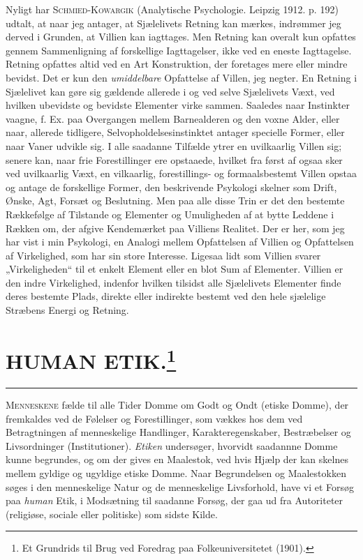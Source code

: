 \documentclass[12pt,a4paper,openany]{book}
\newcommand{\opage}[1]{\marginnote{\footnotesize\textit{[#1]}}}
\newcommand{\essay}[2][]{\chapter*{#2}\addcontentsline{toc}{chapter}{#1}}   %
\newcommand{\streg}{\begin{center}\rule{3em}{0.4pt}\end{center}}
\begin{document}
Nyligt har \textsc{Schmied-Kowargik} (Analytische Psychologie.
Leipzig 1912. p. 192) udtalt, at naar jeg antager, at Sjælelivets
Retning kan mærkes, indrømmer jeg derved i Grunden, at
Villien kan iagttages. Men Retning kan overalt kun opfattes
gennem Sammenligning af forskellige Iagttagelser, ikke ved en
eneste Iagttagelse. Retning opfattes altid ved en Art Konstruktion,
der foretages mere eller mindre bevidst. Det er kun den
\textit{umiddelbare} Opfattelse af Villen, jeg negter. En Retning i Sjælelivet
kan gøre sig gældende allerede i og ved selve Sjælelivets
Væxt, ved hvilken ubevidste og bevidste Elementer virke sammen.
Saaledes naar Instinkter vaagne, f. Ex. paa Overgangen
mellem Barnealderen og den voxne Alder, eller naar, allerede
tidligere, Selvopholdelsesinstinktet antager specielle Former, eller
naar Vaner udvikle sig. I alle saadanne Tilfælde ytrer en uvilkaarlig
Villen sig; senere kan, naar frie Forestillinger ere opstaaede,
hvilket fra først af ogsaa sker ved uvilkaarlig Væxt,
en vilkaarlig, forestillings- og formaalsbestemt Villen opstaa og
antage de forskellige Former, den beskrivende Psykologi skelner
som Drift, Ønske, Agt, Forsæt og Beslutning. Men paa alle
disse Trin er det den bestemte Rækkefølge af Tilstande og
\setcounter{footnote}{0}%
\opage{53}Elementer og Umuligheden af at bytte Leddene i Rækken om,
der afgive Kendemærket paa Villiens Realitet. Der er her,
som jeg har vist i min Psykologi, en Analogi mellem Opfattelsen
af Villien og Opfattelsen af Virkelighed, som har sin store
Interesse. Ligesaa lidt som Villien svarer „Virkeligheden“ til
et enkelt Element eller en blot Sum af Elementer. Villien er
den indre Virkelighed, indenfor hvilken tilsidst alle Sjælelivets
Elementer finde deres bestemte Plads, direkte eller indirekte
bestemt ved den hele sjælelige Stræbens Energi og Retning.

\setcounter{footnote}{0}%
\opage{54}\essay[Human Etik (1901)]{HUMAN ETIK.\footnote[1]{Et Grundrids til Brug ved Foredrag paa Folkeuniversitetet (1901).}}
\streg

M\textsc{enneskene} fælde til alle Tider Domme om Godt og Ondt
(etiske Domme), der fremkaldes ved de Følelser og Forestillinger,
som vækkes hos dem ved Betragtningen af menneskelige
Handlinger, Karakteregenskaber, Bestræbelser og Livsordninger
(Institutioner). \textit{Etiken} undersøger, hvorvidt saadannne
Domme kunne begrundes, og om der gives en Maalestok, ved hvis
Hjælp der kan skelnes mellem gyldige og ugyldige etiske Domme.
Naar Begrundelsen og Maalestokken søges i den menneskelige
Natur og de menneskelige Livsforhold, have vi et Forsøg paa
\textit{human} Etik, i Modsætning til saadanne Forsøg, der gaa ud fra
Autoriteter (religiøse, sociale eller politiske) som sidste Kilde.
\end{document}
